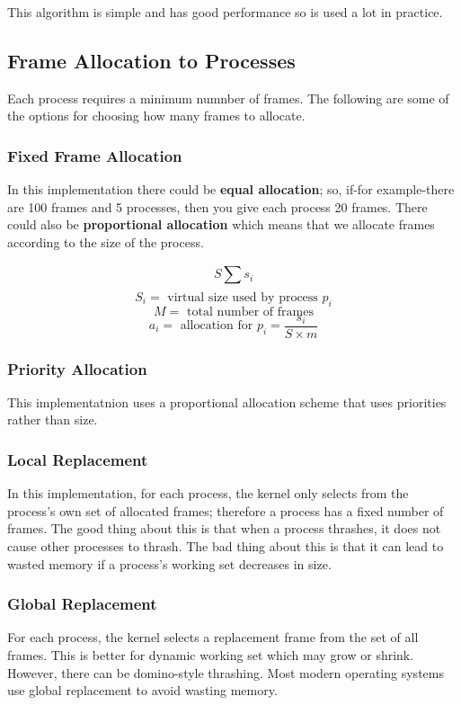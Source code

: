 \documentclass{article}
\newcommand{\bold}[1]{\textbf{#1}}
\begin{document}
This algorithm is simple and has good performance so is used a lot in practice. 

\subsection{Frame Allocation to Processes}

Each process requires a minimum numnber of frames. The following are some of the options for choosing how many frames to allocate.

\subsubsection{Fixed Frame Allocation}

In this implementation there could be \bold{equal allocation}; so, if-for example-there are 100 frames and 5 processes, then you give each process 20 frames. There could also be \bold{proportional allocation} which means that we allocate frames according to the size of the process. 

$$S \sum_{}^{} s_i$$
$$S_i = \textrm{ virtual size used by process } p_i$$
$$M = \textrm{ total number of frames}$$ 
$$a_i = \textrm{ allocation for } p_i = \frac{s_i}{S \times m}$$

\subsubsection{Priority Allocation}

This implementatnion uses a proportional allocation scheme that uses priorities rather than size. 

\subsubsection{Local Replacement}

In this implementation, for each process, the kernel only selects from the process's own set of allocated frames; therefore a process has a fixed number of frames. The good thing about this is that when a process thrashes, it does not cause other processes to thrash. The bad thing about this is that it can lead to wasted memory if a process's working set decreases in size. 

\subsubsection{Global Replacement}

For each process, the kernel selects a replacement frame from the set of all frames. This is better for dynamic working set which may grow or shrink. However, there can be domino-style thrashing. Most modern operating systems use global replacement to avoid wasting memory. 
\end{document}
